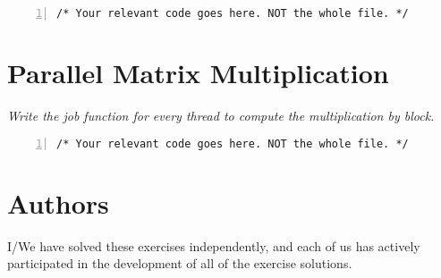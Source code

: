 \documentclass{article}
\begin{document}
\begin{ExerciseList}
\begin{lstlisting}[basicstyle=\small\sffamily,
keywords={break,case,const,continue,default,else,enum,
for,if,return,switch,while,do,long,void,int,float,double,
char,struct,typedef,include,size\_t},
keywordstyle={\color{blue}},
comment={[l]{//}}, morecomment={[s]{/*}{*/}}, commentstyle=\itshape,
columns={[l]flexible}, numbers=left, numberstyle=\tiny,
frameround=fftt, frame=shadowbox, captionpos=b,
caption={Parallelized computation of Mandelbrot's set.},
label=LST:mandelbrot2]
/* Your relevant code goes here. NOT the whole file. */
\end{lstlisting}

\end{ExerciseList}

\section{Parallel Matrix Multiplication}

\begin{ExerciseList}
\Exercise
{}
\Question
\emph{Write the job function for every thread to compute the
  multiplication by block.}

\begin{lstlisting}[basicstyle=\small\sffamily,
keywords={break,case,const,continue,default,else,enum,
for,if,return,switch,while,do,long,void,int,float,double,
char,struct,typedef,include,size\_t},
keywordstyle={\color{blue}},
comment={[l]{//}}, morecomment={[s]{/*}{*/}}, commentstyle=\itshape,
columns={[l]flexible}, numbers=left, numberstyle=\tiny,
frameround=fftt, frame=shadowbox, captionpos=b,
caption={Parallelized matrix multiplication by block.},
label=LST:blockmatmult]
/* Your relevant code goes here. NOT the whole file. */
\end{lstlisting}

\end{ExerciseList}


\newpage
\section{Authors}
I/We have solved these exercises independently, and each of us has actively
participated in the development of all of the exercise solutions.
\vspace{1cm}
\end{document}
